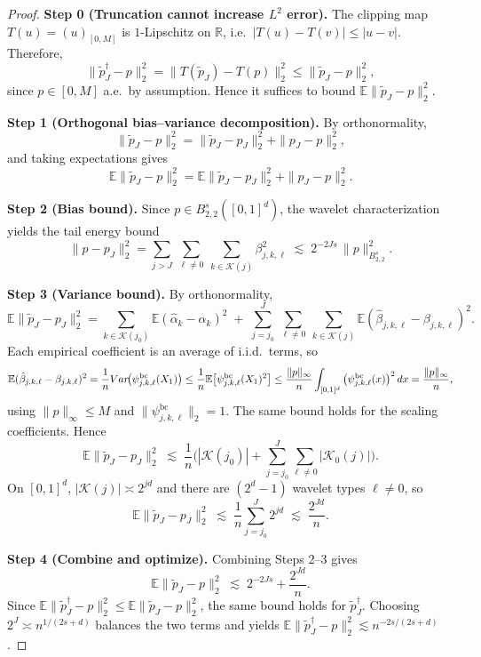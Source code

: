 \documentclass[10pt,a4paper]{amsart}
\def\EE{\mathbb{E}}
\def\RR{\mathbb{R}}
\def\calK{\mathcal{K}}
\begin{document}
\begin{proof}
\textbf{Step 0 (Truncation cannot increase $L^2$ error).}
The clipping map $T(u)=(u)_{[0,M]}$ is $1$-Lipschitz on $\RR$, i.e.\ $|T(u)-T(v)|\le |u-v|$.
Therefore,
\[
\|\tilde p_J^{\dagger} - p\|_2^2
=
\|T(\tilde p_J)-T(p)\|_2^2
\le
\|\tilde p_J - p\|_2^2,
\]
since $p\in[0,M]$ a.e.\ by assumption. Hence it suffices to bound $\EE\|\tilde p_J-p\|_2^2$.

\textbf{Step 1 (Orthogonal bias--variance decomposition).}
By orthonormality,
\[
\|\tilde p_J - p\|_2^2
=
\|\tilde p_J - p_J\|_2^2 + \|p_J - p\|_2^2,
\]
and taking expectations gives
\[
\EE\|\tilde p_J - p\|_2^2
=
\EE\|\tilde p_J - p_J\|_2^2 + \|p_J - p\|_2^2.
\]

\textbf{Step 2 (Bias bound).}
Since $p\in B^s_{2,2}([0,1]^d)$,
the wavelet characterization yields the tail energy bound
\[
\|p-p_J\|_2^2
=
\sum_{j>J}\ \sum_{\ell\neq 0}\ \sum_{k\in\calK(j)} \beta_{j,k,\ell}^2
\;\lesssim\;
2^{-2Js}\,\|p\|_{B^s_{2,2}}^2.
\]

\textbf{Step 3 (Variance bound).}
By orthonormality,
\[
\EE\|\tilde p_J - p_J\|_2^2
=
\sum_{k\in\calK(j_0)} \EE(\hat\alpha_k-\alpha_k)^2
\;+\;
\sum_{j=j_0}^{J}\ \sum_{\ell\neq 0}\ \sum_{k\in\calK(j)}
\EE(\hat\beta_{j,k,\ell}-\beta_{j,k,\ell})^2.
\]
Each empirical coefficient is an average of i.i.d.\ terms, so
\[
\EE(\hat\beta_{j,k,\ell}-\beta_{j,k,\ell})^2
=
\frac{1}{n}\textup{Var}\!\big(\psi^{\mathrm{bc}}_{j,k,\ell}(X_1)\big)
\le
\frac{1}{n}\EE\big[\psi^{\mathrm{bc}}_{j,k,\ell}(X_1)^2\big]
\le
\frac{\|p\|_{\infty}}{n}\int_{[0,1]^d} \big(\psi^{\mathrm{bc}}_{j,k,\ell}(x)\big)^2\,dx
=
\frac{\|p\|_{\infty}}{n},
\]
using $\|p\|_\infty\le M$ and $\|\psi^{\mathrm{bc}}_{j,k,\ell}\|_2=1$.
The same bound holds for the scaling coefficients.
Hence
\[
\EE\|\tilde p_J - p_J\|_2^2
\;\lesssim\;
\frac{1}{n}\Big(|\calK(j_0)| + \sum_{j=j_0}^{J}\sum_{\ell\neq 0}|\calK_0(j)|\Big).
\]
On $[0,1]^d$, $|\calK(j)|\asymp 2^{jd}$ and there are $(2^d-1)$ wavelet types $\ell\neq 0$, so
\[
\EE\|\tilde p_J - p_J\|_2^2 \;\lesssim\; \frac{1}{n}\sum_{j=j_0}^{J} 2^{jd}
\;\lesssim\; \frac{2^{Jd}}{n}.
\]

\textbf{Step 4 (Combine and optimize).}
Combining Steps 2--3 gives
\[
\EE\|\tilde p_J - p\|_2^2 \;\lesssim\; 2^{-2Js} + \frac{2^{Jd}}{n}.
\]
Since $\EE\|\tilde p_J^{\dagger}-p\|_2^2\le \EE\|\tilde p_J-p\|_2^2$, the same bound holds for $\tilde p_J^{\dagger}$.
Choosing $2^J\asymp n^{1/(2s+d)}$ balances the two terms and yields
$\EE\|\tilde p_J^{\dagger}-p\|_2^2 \lesssim n^{-2s/(2s+d)}$.
\end{proof}
\end{document}

